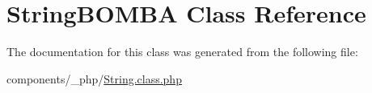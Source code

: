 \hypertarget{class_string_b_o_m_b_a}{
\section{StringBOMBA Class Reference}
\label{class_string_b_o_m_b_a}
}


The documentation for this class was generated from the following file:\begin{CompactItemize}
\item 
components/\_\-php/\hyperlink{_string_8class_8php}{String.class.php}\end{CompactItemize}
